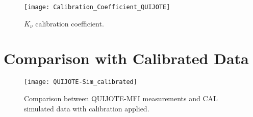\begin{figure}
        \centering
        \texttt{[image: Calibration\_Coefficient\_QUIJOTE]}
        \caption{$K_\nu$ calibration coefficient.}
        \label{fig:calibration_coefficient_quijote}
\end{figure}

\section{Comparison with Calibrated Data}

\begin{figure}
        \centering
        \texttt{[image: QUIJOTE-Sim\_calibrated]}
        \caption{Comparison between QUIJOTE-MFI measurements and
        CAL simulated data with calibration applied.}
        \label{fig:quijote_sim_calibrated}
\end{figure}

